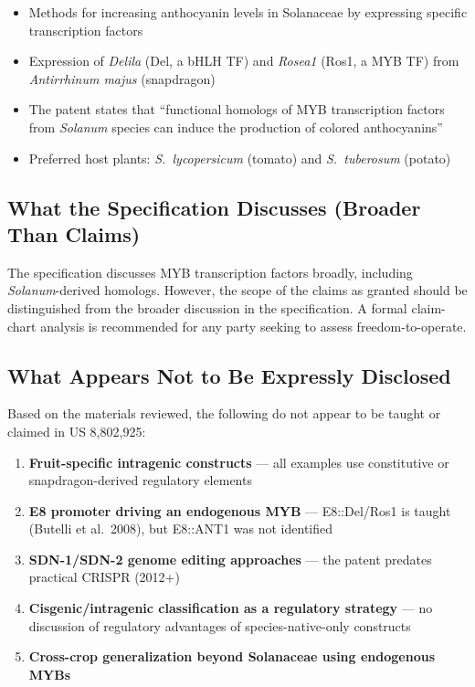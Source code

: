 \documentclass[12pt,a4paper]{article}
\begin{document}
\begin{itemize}
  \item Methods for increasing anthocyanin levels in Solanaceae by expressing specific transcription factors
  \item Expression of \textit{Delila} (Del, a bHLH TF) and \textit{Rosea1} (Ros1, a MYB TF) from \textit{Antirrhinum majus} (snapdragon)
  \item The patent states that ``functional homologs of MYB transcription factors from \textit{Solanum} species can induce the production of colored anthocyanins''
  \item Preferred host plants: \textit{S.~lycopersicum} (tomato) and \textit{S.~tuberosum} (potato)
\end{itemize}

\subsection{What the Specification Discusses (Broader Than Claims)}

The specification discusses MYB transcription factors broadly, including \textit{Solanum}-derived homologs. However, the scope of the claims as granted should be distinguished from the broader discussion in the specification. A formal claim-chart analysis is recommended for any party seeking to assess freedom-to-operate.

\subsection{What Appears Not to Be Expressly Disclosed}

Based on the materials reviewed, the following do not appear to be taught or claimed in US 8,802,925:

\begin{enumerate}
  \item \textbf{Fruit-specific intragenic constructs} --- all examples use constitutive or snapdragon-derived regulatory elements
  \item \textbf{E8 promoter driving an endogenous MYB} --- E8::Del/Ros1 is taught (Butelli et al.\ 2008), but E8::ANT1 was not identified
  \item \textbf{SDN-1/SDN-2 genome editing approaches} --- the patent predates practical CRISPR (2012+)
  \item \textbf{Cisgenic/intragenic classification as a regulatory strategy} --- no discussion of regulatory advantages of species-native-only constructs
  \item \textbf{Cross-crop generalization beyond Solanaceae using endogenous MYBs}
\end{enumerate}
\end{document}
